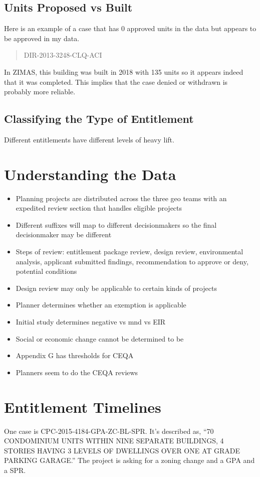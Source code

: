 \documentclass[12pt]{article}
\theoremstyle{definition}
\begin{document}
  \subsection{Units Proposed vs Built}
  Here is an example of a case that has 0 approved units in the data but appears to be approved in my data. 
  \begin{quote}
    DIR-2013-3248-CLQ-ACI
  \end{quote}
  In ZIMAS, this building was built in 2018 with 135 units so it appears indeed that it was completed. This implies that the case denied or withdrawn is probably more reliable.

\subsection{Classifying the Type of Entitlement}
Different entitlements have different levels of heavy lift. 

\section{Understanding the Data}
\begin{itemize}
    \item Planning projects are distributed across the three geo teams with an expedited review section that handles eligible projects
    \item Different suffixes will map to different decisionmakers so the final decisionmaker may be different 
    \item Steps of review: entitlement package review, design review, environmental analysis, applicant submitted findings, recommendation to approve or deny, potential conditions
    \item Design review may only be applicable to certain kinds of projects 
    \item Planner determines whether an exemption is applicable
    \item Initial study determines negative vs mnd vs EIR
    \item Social or economic change cannot be determined to be 
    \item Appendix G has thresholds for CEQA 
    \item Planners seem to do the CEQA reviews
\end{itemize}


\section{Entitlement Timelines}
One case is CPC-2015-4184-GPA-ZC-BL-SPR. It's described as, ``70 CONDOMINIUM UNITS WITHIN NINE SEPARATE BUILDINGS, 4 STORIES HAVING 3 LEVELS OF DWELLINGS OVER ONE AT GRADE PARKING GARAGE.'' The project is asking for a zoning change and a GPA and a SPR.
\end{document}
